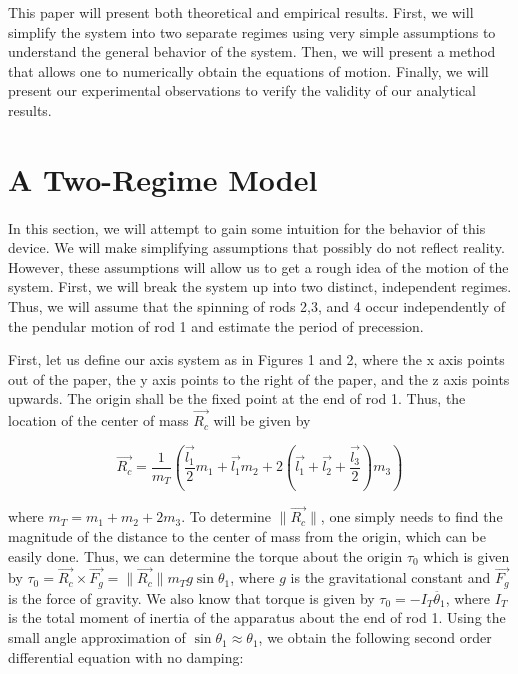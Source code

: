 \documentclass[12pt]{article}
\begin{document}
This paper will present both theoretical and empirical results. First, we will simplify the system into two separate regimes using very simple assumptions to understand the general behavior of the system. Then, we will present a method that allows one to numerically obtain the equations of motion. Finally, we will present our experimental observations to verify the validity of our analytical results. 

\section{A Two-Regime Model}

\paragraph{} In this section, we will attempt to gain some intuition for the behavior of this device. We will make simplifying assumptions that possibly do not reflect reality. However, these assumptions will allow us to get a rough idea of the motion of the system. First, we will break the system up into two distinct, independent regimes. Thus, we will assume that the spinning of rods 2,3, and 4 occur independently of the pendular motion of rod 1 and estimate the period of precession. 

First, let us define our axis system as in Figures 1 and 2, where the x axis points out of the paper, the y axis points to the right of the paper, and the z axis points upwards. The origin shall be the fixed point at the end of rod 1. Thus, the location of the center of mass $\vec{R_{c}}$ will be given by 

\begin{equation}
\vec{R_{c}} = \frac{1}{m_T} \left(\frac{\vec{l_1}}{2} m_1 + \vec{l_1}m_2 + 2\left(\vec{l_1} + \vec{l_2} + \frac{\vec{l_3}}{2}\right)m_3 \right)
\end{equation}

where $ m_T = m_1 + m_2 + 2m_3$. To determine $\| \vec{R_c} \|$, one simply needs to find the magnitude of the distance to the center of mass from the origin, which can be easily done. Thus, we can determine the torque about the origin $\tau_0$ which is given by $\tau_0 = \vec{R_{c}} \times \vec{F_g} = \| \vec{R_{c}} \| m_T g \sin\theta_1$, where $g$ is the gravitational constant and $\vec{F_g}$ is the force of gravity. We also know that torque is given by $\tau_0 = -I_T \ddot{\theta_1}$, where $I_T$ is the total moment of inertia of the apparatus about the end of rod 1. Using the small angle approximation of $\sin \theta_1 \approx \theta_1$, we obtain the following second order differential equation with no damping:
\end{document}
